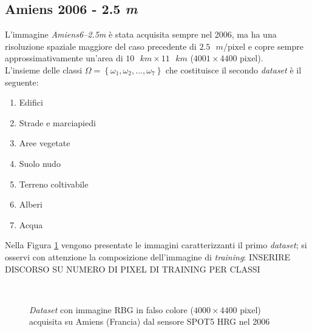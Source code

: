 \subsection{Amiens 2006 - 2.5 \textit{m}}
L'immagine \emph{Amiens6--2.5m} è stata acquisita sempre nel 2006, ma ha una risoluzione  spaziale maggiore del caso precedente di $2.5\text{ }m/\text{pixel}$  e copre sempre approssimativamente un'area di $10\text{ }km\times11\text{ }km$ ($4001\times4400$ pixel).\\
L'insieme delle classi $\Omega=\left\lbrace\omega_1,\omega_2,\ldots,\omega_{7}\right\rbrace$ che costituisce il secondo \emph{dataset} è il seguente:
\begin{enumerate}
\item Edifici
\item Strade e marciapiedi
\item Aree vegetate
\item Suolo nudo
\item Terreno coltivabile
\item Alberi
\item Acqua
\end{enumerate}
Nella Figura \ref{fig: Amiens62_5m} vengono presentate le immagini caratterizzanti il primo \emph{dataset}; si osservi con attenzione la composizione dell'immagine di \emph{training}: INSERIRE DISCORSO SU NUMERO DI PIXEL DI TRAINING PER CLASSI
\clearpage
\begin{figure}[!ht]
   \center
   \\%
     \hspace{4mm}
    \caption{\emph{Dataset} con immagine RBG in falso colore ($4000\times4400$ pixel) acquisita su Amiens (Francia) dal sensore \textsc{SPOT5 HRG} nel 2006}
    \label{fig: Amiens62_5m}
  \end{figure}
\clearpage



